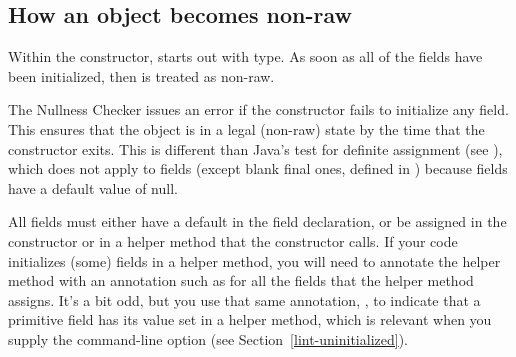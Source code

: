 

\subsection{How an object becomes non-raw\label{becoming-non-raw}}

Within the constructor,
 starts out with  type.
As soon as all of the  fields
have been initialized, then  is treated as non-raw.

The Nullness Checker issues an error if the constructor fails to initialize
any  field.  This ensures that the object is in a legal (non-raw)
state by the time that the constructor exits.
This is different than Java's test for definite assignment (see
),
which does not apply to fields (except blank final ones, defined in
) because fields
have a default value of null.



All  fields must either have a
default in the field declaration, or be assigned in the constructor or in a
helper method that the constructor calls.  If
your code initializes (some) fields in a helper method, you will need to
annotate the helper method with an annotation such as
for all the fields that the helper method assigns.
It's a bit odd, but you use that same annotation, ,
to indicate that a primitive field has its value set in a helper method,
which is relevant when you supply the 
command-line option (see Section~\ref{lint-uninitialized}).

